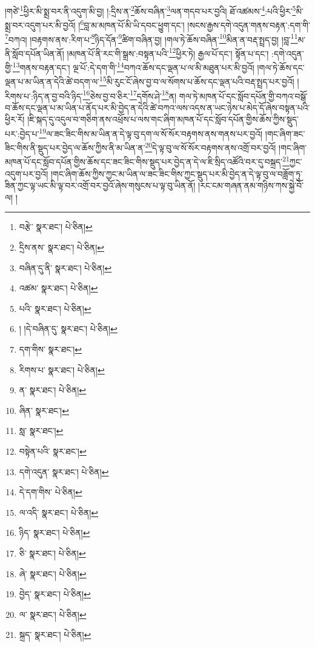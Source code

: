 །གཙེ་\footnote{བརྩེ་  སྣར་ཐང་།  པེ་ཅིན། }ཕྱིར་མི་སྨྲ་བར་ནི་འདུག་མི་བྱ། །:དྲིས་ན་\footnote{དྲིས་ནས་  སྣར་ཐང་།  པེ་ཅིན། }ཆོས་བཞིན་\footnote{བཞིན་དུ་ནི་  སྣར་ཐང་།  པེ་ཅིན། }ལན་གདབ་པར་བྱའི། ཐོ་འཚམས་\footnote{འཚམ་  སྣར་ཐང་།  པེ་ཅིན། }:པའི་ཕྱིར་\footnote{པའི་  སྣར་ཐང་།  པེ་ཅིན། }མི་སྨྲ་བར་འདུག་པར་མི་བྱའོ། །\footnote{། །དེ་བཞིན་དུ་  སྣར་ཐང་།  པེ་ཅིན། }བླ་མ་མཁན་པོ་མི་ཡི་དབང་ཕྱུག་དང་། །སངས་རྒྱས་དགེ་འདུན་གནས་བརྟན་:དག་གི་\footnote{དག་གིས་  སྣར་ཐང་། }བཀའ། །བརྟགས་ནས་:རིག་པ་\footnote{རིགས་པ་  སྣར་ཐང་།  པེ་ཅིན། }ཉིད་དོན་\footnote{ན་  སྣར་ཐང་།  པེ་ཅིན། }ཚིག་བཞིན་བྱ། །གལ་ཏེ་ཆོས་བཞིན་\footnote{ཞིན་  སྣར་ཐང་། }མིན་ན་བརྡ་སྤྲད་བྱ། །བླ་\footnote{སླ་  སྣར་ཐང་། }མ་ནི་སློབ་དཔོན་ཡིན་ནོ། །མཁན་པོ་ནི་རང་གི་སྒྲས་:བསྟན་པའི་\footnote{བསྟེན་པའི་  སྣར་ཐང་། }ཕྱིར་ཏེ། རྒྱལ་པོ་དང་། སྟོན་པ་དང་། :དགེ་འདུན་གྱི་\footnote{དགེ་འདུན་  སྣར་ཐང་།  པེ་ཅིན། }གནས་བརྟན་དང་། ལྔ་པོ་:དེ་དག་གི་\footnote{དེ་དག་གིས་  པེ་ཅིན། }བཀའ་ཆོས་དང་ལྡན་པ་ལ་མི་མཐུན་པར་མི་བྱའོ། །གལ་ཏེ་ཆོས་དང་ལྡན་པ་མ་ཡིན་ན་དེའི་ཚེ་བདག་ལ་\footnote{ལ་འདི་  སྣར་ཐང་།  པེ་ཅིན། }མི་རུང་ངོ་ཞེས་བྱ་བ་ལ་སོགས་པ་ཆོས་དང་ལྡན་པའི་བརྡ་སྤྲད་པར་བྱའོ། །རིགས་པ་:ཉིད་ན་བྱ་བའི་ཉིད་\footnote{ཉིད་  སྣར་ཐང་།  པེ་ཅིན། }ཅེས་བྱ་བ་ཅིར་\footnote{ཅི་  སྣར་ཐང་།  པེ་ཅིན། }དགོས་ཤེ་\footnote{ཞེ་  སྣར་ཐང་།  པེ་ཅིན། }ན། གལ་ཏེ་མཁན་པོ་དང་སློབ་དཔོན་གྱི་བཀའ་བསྒོ་བ་ཆོས་དང་ལྡན་པ་མ་ཡིན་པ་ནོད་པར་མི་བྱེད་ན་དེའི་ཚེ་བཀའ་ལས་འདས་ན་ཡང་ཉེས་པ་མེད་དོ་ཞེས་བསྟན་པའི་ཕྱིར་རོ། །ཇི་སྐད་དུ་འདུལ་བ་གཅིག་ནས་འཕྲོས་པ་ལས་གང་ཞིག་མཁན་པོ་དང་སློབ་དཔོན་གྱིས་ཆོས་ཀྱིས་སྡུད་པར་:བྱེད་པ་\footnote{བྱེད་  སྣར་ཐང་།  པེ་ཅིན། }ལ་ཟང་ཟིང་གིས་མ་ཡིན་ན་དེ་ལྟ་བུ་དག་ལ་སོ་སོར་བརྟགས་ནས་གནས་པར་བྱའོ། །གང་ཞིག་ཟང་ཟིང་གིས་ནི་སྡུད་པར་བྱེད་ལ་ཆོས་ཀྱིས་ནི་མ་ཡིན་ན་\footnote{ལ་  སྣར་ཐང་།  པེ་ཅིན། }དེ་ལྟ་བུ་ལ་སོ་སོར་བརྟགས་ནས་འགྲོ་བར་བྱའོ། །གང་ཞིག་མཁན་པོ་དང་སློབ་དཔོན་གྱིས་ཆོས་དང་ཟང་ཟིང་གིས་སྡུད་པར་བྱེད་ན་དེ་ལ་ཇི་སྲིད་འཚོའི་བར་དུ་བསྐྲད་\footnote{སྐྲད་  སྣར་ཐང་།  པེ་ཅིན། }ཀྱང་འདུག་པར་བྱའོ། །གང་ཞིག་ཆོས་ཀྱིས་ཀྱང་མ་ཡིན་ལ་ཟང་ཟིང་གིས་ཀྱང་སྡུད་པར་མི་བྱེད་ན་དེ་ལྟ་བུ་ལ་བཟློག་ཏུ་ཟིན་ཀྱང་ལྟ་ཡང་མི་ལྟ་བར་འགྲོ་བར་བྱའོ་ཞེས་གསུངས་པ་ལྟ་བུ་ཡིན་ནོ། །རང་ངམ་གཞན་ནམ་གཉིས་ཀས་སྐྱེ་བོ་ལ། །
